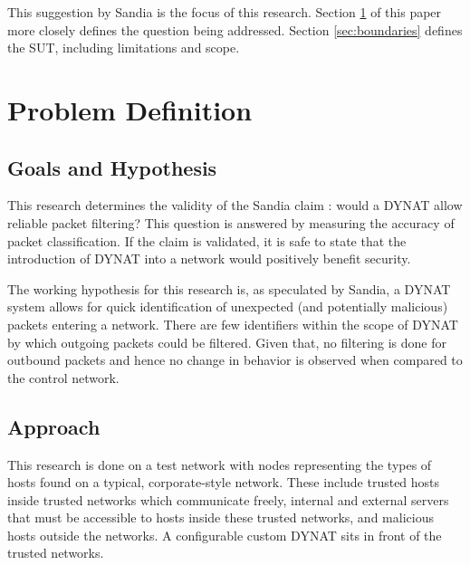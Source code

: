 \par This suggestion by Sandia is the focus of this research. Section \ref{sec:problem_def} of this paper more closely defines the question being addressed. Section \ref{sec:boundaries} defines the \ac{SUT}, including limitations and scope. 

\section{Problem Definition}
\label{sec:problem_def}
\subsection{Goals and Hypothesis}
\label{sec:goals}
\par This research determines the validity of the Sandia claim \cite{SandiaDynat}: would a \ac{DYNAT} allow reliable packet filtering? This question is answered by measuring the accuracy of packet classification. If the claim is validated, it is safe to state that the introduction of \ac{DYNAT} into a network would positively benefit security.


\par The working hypothesis for this research is, as speculated by Sandia, a \ac{DYNAT} system allows for quick identification of unexpected (and potentially malicious) packets entering a network. There are few identifiers within the scope of \ac{DYNAT} by which outgoing packets could be filtered. Given that, no filtering is done for outbound packets and hence no change in behavior is observed when compared to the control network. 

\subsection{Approach}
\label{sec:approach}
\par This research is done on a test network with nodes representing the types of hosts found on a typical, corporate-style network. These include trusted hosts inside trusted networks which communicate freely, internal and external servers that must be accessible to hosts inside these trusted networks, and malicious hosts outside the networks. A configurable custom \ac{DYNAT} sits in front of the trusted networks. 

